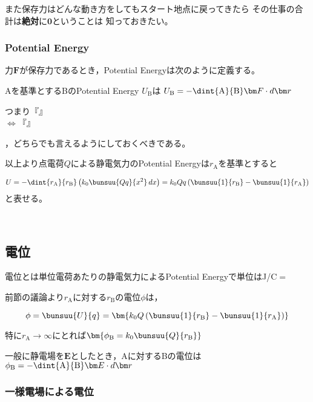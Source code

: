    また保存力はどんな動き方をしてもスタート地点に戻ってきたら
   その仕事の合計は{\bfseries 絶対}に$\bm 0$ということは
   知っておきたい。

   \subsubsection{Potential Energy}\label{PE}

   力$\bm F$が保存力であるとき，Potential Energyは次のように定義する。

   Aを基準とするBのPotential Energy $U_\text{B}$は%
   $U_\text{B}=-\dint{\text A}{\text B}\bm F\cdot d\bm r$

   つまり『』\hfill {} \\
   $\Longleftrightarrow$『』\hfill {}

   ，どちらでも言えるようにしておくべきである。

   以上より点電荷$Q$による静電気力のPotential Energyは$r_\text{A}$を基準とすると

   $$U=-\dint{r_\text{A}}{r_\text{B}}\left(k_0\bunsuu{Qq}{x^2}\,dx\right)=k_0Qq\left(\bunsuu{1}{r_\text{B}}-\bunsuu{1}{r_\text{A}}\right)$$
   と表せる。

   ﻿\subsection{電位}

   電位とは単位電荷あたりの静電気力によるPotential Energyで単位は\unit{J/C}${}={}$\unit{}

   前節の議論より$r_\text{A}$に対する$r_\text{B}$の電位$\phi$は，

   $$\phi =\bunsuu{U}{q}=\bm{k_0Q\left(\bunsuu{1}{r_\text{B}}-\bunsuu{1}{r_\text{A}}\right)}$$

   特に$r_\text{A}\to\infty$にとれば$\bm{\phi_\text{B}=k_0\bunsuu{Q}{r_\text{B}}}$

   一般に静電場を$\bm E$としたとき，Aに対するBの電位は$\phi_\text{B}=-\dint{\text A}{\text B}\bm E\cdot d\bm r$

   \subsubsection{一様電場による電位}

